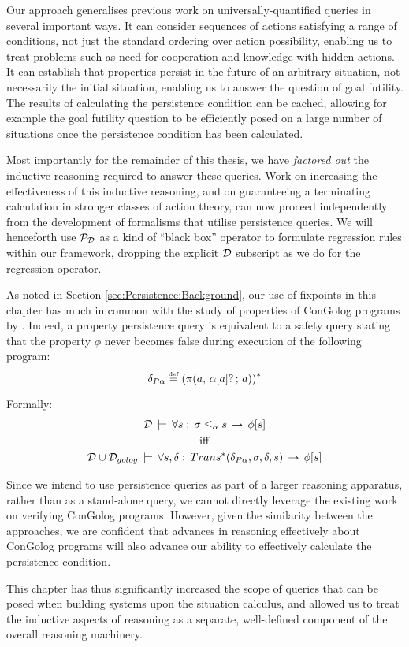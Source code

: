 Our approach generalises previous work on universally-quantified queries
in several important ways. It can consider sequences of actions satisfying
a range of conditions, not just the standard ordering over action
possibility, enabling us to treat problems such as need for cooperation
and knowledge with hidden actions. It can establish that properties
persist in the future of an arbitrary situation, not necessarily the
initial situation, enabling us to answer the question of goal futility.
The results of calculating the persistence condition can be cached,
allowing for example the goal futility question to be efficiently
posed on a large number of situations once the persistence condition
has been calculated.

Most importantly for the remainder of this thesis, we have \emph{factored
out} the inductive reasoning required to answer these queries. Work
on increasing the effectiveness of this inductive reasoning, and on
guaranteeing a terminating calculation in stronger classes of action
theory, can now proceed independently from the development of formalisms
that utilise persistence queries. We will henceforth use $\mathcal{P}_{\mathcal{D}}$
as a kind of {}``black box'' operator to formulate regression rules
within our framework, dropping the explicit $\mathcal{D}$ subscript as we
do for the regression operator.

As noted in Section \ref{sec:Persistence:Background}, our use of
fixpoints in this chapter has much in common with the study of properties
of ConGolog programs by \citep{ternovska97congolog_fixpoint,classen08golog_properties}.
Indeed, a property persistence query is equivalent to a safety query
stating that the property $\phi$ never becomes false during execution
of the following program:\[
\delta_{P\alpha}\stackrel{\mbox{\tiny def}}{=}\left(\pi(a,\,\alpha[a]?\,;\, a)\right)^{*}\]


Formally:\begin{gather*}
\mathcal{D}\,\models\,\forall s:\,\sigma\leq_{\alpha}s\,\rightarrow\,\phi[s]\\
\mathrm{iff}\\
\mathcal{D}\cup\mathcal{D}_{golog}\,\models\,\forall s,\delta:\, Trans^{*}(\delta_{P\alpha},\sigma,\delta,s)\,\rightarrow\,\phi[s]\end{gather*}


Since we intend to use persistence queries as part of a larger reasoning
apparatus, rather than as a stand-alone query, we cannot directly
leverage the existing work on verifying ConGolog programs. However,
given the similarity between the approaches, we are confident that
advances in reasoning effectively about ConGolog programs will also
advance our ability to effectively calculate the persistence condition.

This chapter has thus significantly increased the scope of queries
that can be posed when building systems upon the situation calculus,
and allowed us to treat the inductive aspects of reasoning as a separate,
well-defined component of the overall reasoning machinery.

